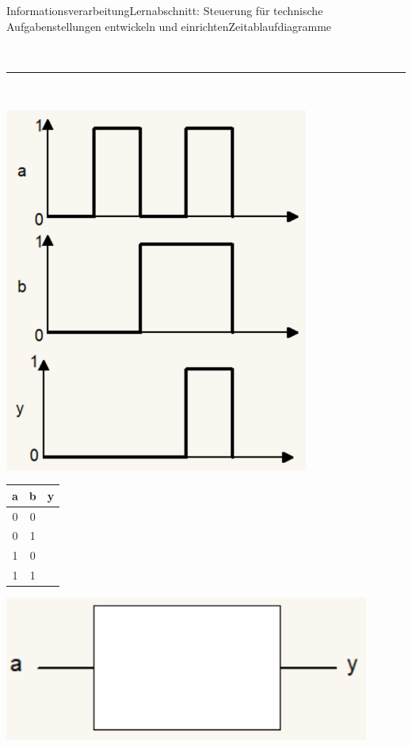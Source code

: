 \documentclass[oneside,openany,headings=optiontotoc,11pt,numbers=noenddot]{scrreprt}
\begin{document}
\begin{worksheet}{Informationsverarbeitung}{Lernabschnitt: Steuerung für technische Aufgabenstellungen entwickeln und einrichten}{Zeitablaufdiagramme}
\begin{framed}
\begin{minipage}{0.65\textwidth}
\begin{minipage}{0.65\textwidth}
				\end{minipage}
			\end{minipage}\\
			\par\noindent
			\rule{0.98\textwidth}{0.1pt}\\
			\par\noindent
			\begin{minipage}{0.35\textwidth}
				\includegraphics[width=0.75\textwidth]{99_Bilder/04_TI/04_02.png}
			\end{minipage}
			\hfill
			\begin{minipage}{0.65\textwidth}
				\begin{minipage}{0.25\textwidth}
					\begin{tabular}{cc|c}
						a & b& y\\
						\hline
						0 & 0 & \\
						0 & 1 & \\
						1 & 0 & \\
						1 & 1 &
					\end{tabular}
				\end{minipage}
				\hfill
				\begin{minipage}{0.65\textwidth}
					\includegraphics[width=0.9\textwidth]{99_Bilder/04_TI/04_01_G.png}

\end{minipage}
\end{minipage}
\end{framed}
\end{worksheet}
\end{document}
